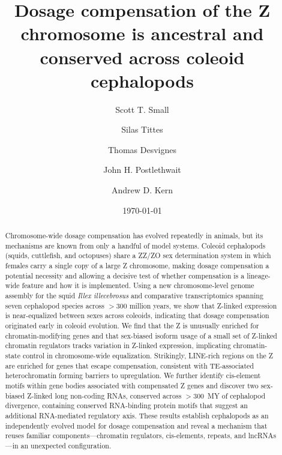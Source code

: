 \documentclass[12pt]{article}
\title{Dosage compensation of the Z chromosome is ancestral and conserved across coleoid cephalopods}
\author[1, 2]{Scott T. Small}
\author[1, 2]{Silas Tittes}
\author[3,4]{Thomas Desvignes}
\author[1,4]{John H. Postlethwait}
\author[1, 2]{Andrew D. Kern}
\affil[1]{\small{University of Oregon, Institute of Ecology and Evolution}}
\affil[2]{\small{University of Oregon, Department of Biology}}
\affil[3]{\small{Department of Biology, University of Alabama at Birmingham}}
\affil[4]{\small{University of Oregon, Institute of Neuroscience}}
\date{\small{\today{}}}
\begin{document}
\maketitle

\begin{abstract}
Chromosome-wide dosage compensation has evolved repeatedly in animals, but its mechanisms are
known from only a handful of model systems. Coleoid cephalopods (squids, cuttlefish, and octopuses)
share a ZZ/ZO sex determination system in which females carry a single copy of a large Z chromosome,
making dosage compensation a potential necessity and allowing a decisive test of whether compensation
is a lineage-wide feature and how it is implemented. Using a new chromosome-level genome assembly for the squid \textit{Illex illecebrosus}
and comparative transcriptomics spanning seven cephalopod species across $>$300 million years,
we show that Z-linked expression is near-equalized between sexes across coleoids, indicating that
dosage compensation originated early in coleoid evolution.
We find that the Z is unusually enriched for chromatin-modifying genes and that sex-biased isoform
usage of a small set of Z-linked chromatin regulators tracks variation in Z-linked expression,
implicating chromatin-state control in chromosome-wide equalization. Strikingly, LINE-rich regions
on the Z are enriched for genes that escape compensation, consistent with TE-associated heterochromatin
forming barriers to upregulation. We further identify cis-element motifs within gene bodies associated with
compensated Z genes and discover two sex-biased Z-linked long non-coding RNAs,
conserved across $>$300~MY of cephalopod divergence,
containing conserved RNA-binding protein motifs that suggest an additional RNA-mediated regulatory axis.
These results establish cephalopods as an independently evolved model for dosage compensation and reveal a mechanism that
reuses familiar components---chromatin regulators, cis-elements, repeats, and lncRNAs---in an
unexpected configuration.
\end{abstract}
\end{document}
